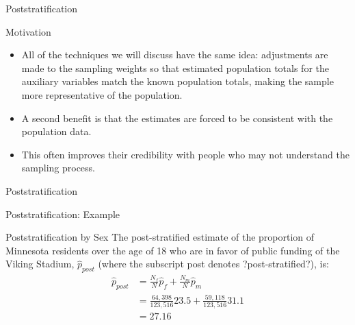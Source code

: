 \documentclass[10pt]{beamer}\usepackage[]{graphicx}\usepackage[]{xcolor}
\begin{document}
\begin{frame}{Poststratification}
\begin{block}{Motivation}
\begin{itemize}
\item All of the techniques we will discuss have the same idea: adjustments are made to the sampling weights so that estimated population totals for the auxiliary variables match the known population totals, making the sample more representative of the population.
\item A second benefit is that the estimates are forced to be consistent with the population data.
\item This often improves their credibility with people who may not understand the sampling process.
\end{itemize}
\end{block}
\end{frame}


\begin{frame}{Poststratification}
\end{frame}


\begin{frame}{Poststratification: Example}
\begin{block}{Poststratification by Sex}
The post-stratified estimate of the proportion of Minnesota residents over the age of
18 who are in favor of public funding of the Viking Stadium, $\hat{p}_{post}$ (where the subscript
post denotes ?post-stratified?), is:
\begin{align*}
\hat{p}_{post} &= \frac{N_f}{N}\hat{p}_f+\frac{N_m}{N} \hat{p}_m\\
&= \frac{64,398}{123,516}23.5+\frac{59,118}{123,516}31.1\\
&= 27.16
\end{align*}
\end{block}
\end{frame}
\end{document}
